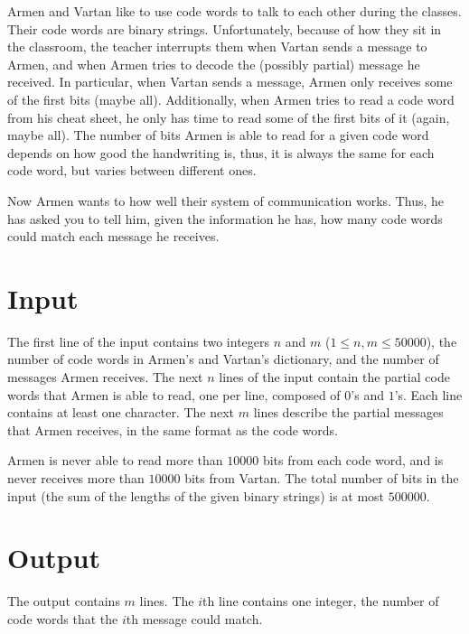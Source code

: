 
Armen and Vartan like to use code words to talk to each other during the classes.
Their code words are binary strings.
Unfortunately, because of how they sit in the classroom, the teacher interrupts them when Vartan sends a message to Armen, and when Armen tries to decode the (possibly partial) message he received.
In particular, when Vartan sends a message, Armen only receives some of the first bits (maybe all).
Additionally, when Armen tries to read a code word from his cheat sheet, he only has time to read some of the first bits of it (again, maybe all).
The number of bits Armen is able to read for a given code word depends on how good the handwriting is, thus, it is always the same for each code word, but varies between different ones.

Now Armen wants to how well their system of communication works.
Thus, he has asked you to tell him, given the information he has, how many code words could match each message he receives.

\section*{Input}
The first line of the input contains two integers $n$ and $m$ ($1 \leq n, m \leq 50000$), the number of code words in Armen's and Vartan's dictionary, and the number of messages Armen receives.
The next $n$ lines of the input contain the partial code words that Armen is able to read, one per line, composed of $0$'s and $1$'s.
Each line contains at least one character.
The next $m$ lines describe the partial messages that Armen receives, in the same format as the code words.

Armen is never able to read more than $10000$ bits from each code word, and is never receives more than $10000$ bits from Vartan.
The total number of bits in the input (the sum of the lengths of the given binary strings) is at most $500000$.

\section*{Output}
The output contains $m$ lines.
The $i$th line contains one integer, the number of code words that the $i$th message could match.
